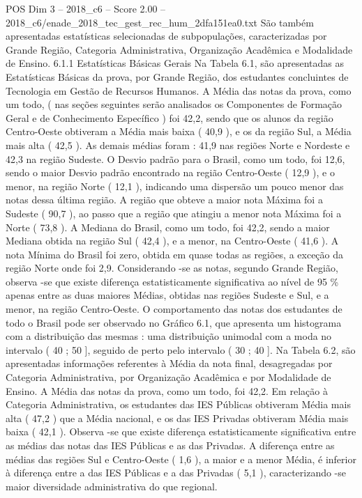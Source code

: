 \begin{textsample}{POS Dim 3 – 2018\_c6 – Score 2.00 – 2018\_c6/enade\_2018\_tec\_gest\_rec\_hum\_2dfa151ea0.txt}
São também apresentadas estatísticas selecionadas de subpopulações, caracterizadas por Grande Região, Categoria Administrativa, Organização Acadêmica e Modalidade de Ensino. 6.1.1 Estatísticas Básicas Gerais Na Tabela 6.1, são apresentadas as Estatísticas Básicas da prova, por Grande Região, dos estudantes concluintes de Tecnologia em Gestão de Recursos Humanos.
A Média das notas da prova, como um todo, ( nas seções seguintes serão analisados os Componentes de Formação Geral e de Conhecimento Específico ) foi 42,2, sendo que os alunos da região Centro-Oeste obtiveram a Média mais baixa ( 40,9 ), e os da região Sul, a Média mais alta ( 42,5 ).
As demais médias foram : 41,9 nas regiões Norte e Nordeste e 42,3 na região Sudeste.
O Desvio padrão para o Brasil, como um todo, foi 12,6, sendo o maior Desvio padrão encontrado na região Centro-Oeste ( 12,9 ), e o menor, na região Norte ( 12,1 ), indicando uma dispersão um pouco menor das notas dessa última região.
A região que obteve a maior nota Máxima foi a Sudeste ( 90,7 ), ao passo que a região que atingiu a menor nota Máxima foi a Norte ( 73,8 ).
A Mediana do Brasil, como um todo, foi 42,2, sendo a maior Mediana obtida na região Sul ( 42,4 ), e a menor, na Centro-Oeste ( 41,6 ).
A nota Mínima do Brasil foi zero, obtida em quase todas as regiões, a exceção da região Norte onde foi 2,9.
Considerando -se as notas, segundo Grande Região, observa -se que existe diferença estatisticamente significativa ao nível de 95 \% apenas entre as duas maiores Médias, obtidas nas regiões Sudeste e Sul, e a menor, na região Centro-Oeste.
O comportamento das notas dos estudantes de todo o Brasil pode ser observado no Gráfico 6.1, que apresenta um histograma com a distribuição das mesmas : uma distribuição unimodal com a moda no intervalo ( 40 ; 50 ], seguido de perto pelo intervalo ( 30 ; 40 ].
Na Tabela 6.2, são apresentadas informações referentes à Média da nota final, desagregadas por Categoria Administrativa, por Organização Acadêmica e por Modalidade de Ensino.
A Média das notas da prova, como um todo, foi 42,2.
Em relação à Categoria Administrativa, os estudantes das IES Públicas obtiveram Média mais alta ( 47,2 ) que a Média nacional, e os das IES Privadas obtiveram Média mais baixa ( 42,1 ).
Observa -se que existe diferença estatisticamente significativa entre as médias das notas das IES Públicas e as das Privadas.
A diferença entre as médias das regiões Sul e Centro-Oeste ( 1,6 ), a maior e a menor Média, é inferior à diferença entre a das IES Públicas e a das Privadas ( 5,1 ), caracterizando -se maior diversidade administrativa do que regional.

\end{textsample}
